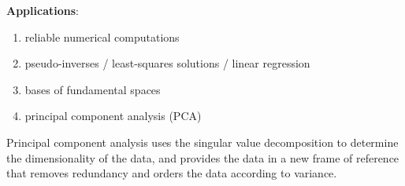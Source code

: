 \begin{paracol}{2}
\textbf{Applications}:

\begin{enumerate}
    \item reliable numerical computations
    \item pseudo-inverses / least-squares solutions / linear regression
    \item bases of fundamental spaces
    \item principal component analysis (PCA)
\end{enumerate}


Principal component analysis uses the singular value decomposition to determine the dimensionality of the data, and provides the data in a new frame of reference that removes redundancy and orders the data according to variance.

\end{paracol}
